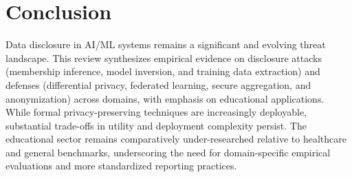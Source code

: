\documentclass[conference]{IEEEtran}
\begin{document}
\section{Conclusion}
\label{sec:Conclusion}
Data disclosure in AI/ML systems remains a significant and evolving threat landscape. This review synthesizes empirical evidence on disclosure attacks (membership inference, model inversion, and training data extraction) and defenses (differential privacy, federated learning, secure aggregation, and anonymization) across domains, with emphasis on educational applications. While formal privacy-preserving techniques are increasingly deployable, substantial trade-offs in utility and deployment complexity persist. The educational sector remains comparatively under-researched relative to healthcare and general benchmarks, underscoring the need for domain-specific empirical evaluations and more standardized reporting practices.

\nocite{*}


\end{document}
